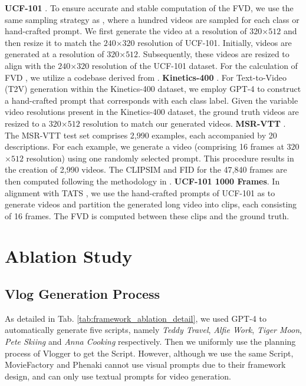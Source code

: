 \textbf{UCF-101} \cite{Soomro2012UCF101AD}.
To ensure accurate and stable computation of the FVD, we use the same sampling strategy as \cite{Wang2023LAVIEHV}, where a hundred videos are sampled for each class or hand-crafted prompt.
We first generate the video at a resolution of $320$$\times$$512$ and then resize it to match the $240$$\times$$320$ resolution of UCF-101.
Initially, videos are generated at a resolution of $320$$\times$$512$. 
Subsequently, these videos are resized to align with the $240$$\times$$320$ resolution of the UCF-101 dataset.
For the calculation of FVD \cite{unterthiner2019accurate}, we utilize a codebase derived from \cite{skorokhodov2022styleganv}.
\noindent\textbf{Kinetics-400} \cite{Kay2017TheKH}.
For Text-to-Video (T2V) generation within the Kinetics-400 dataset, we employ GPT-4 \cite{OpenAI2023GPT4TR} to construct a hand-crafted prompt that corresponds with each class label. 
Given the variable video resolutions present in the Kinetics-400 dataset, the ground truth videos are resized to a $320$$\times$$512$ resolution to match our generated videos.
\textbf{MSR-VTT} \cite{Chen2021TheMT}.
The MSR-VTT test set comprises 2,990 examples, each accompanied by 20 descriptions. 
For each example, we generate a video (comprising 16 frames at $320$$\times$$512$ resolution) using one randomly selected prompt. 
This procedure results in the creation of 2,990 videos.
The CLIPSIM \cite{Wu2021GODIVAGO} and FID \cite{parmar2022aliased} for the 47,840 frames are then computed following the methodology in \cite{singer2023makeavideo}.
\textbf{UCF-101 1000 Frames}.
In alignment with TATS \cite{Ge2022LongVG}, we use the hand-crafted prompts of UCF-101 as \cite{Ge2023PreserveYO} to generate videos and partition the generated long video into clips, each consisting of 16 frames. 
The FVD is computed between these clips and the ground truth.


\section{Ablation Study}
\label{sub:ablation}

\subsection{Vlog Generation Process}
As detailed in Tab. \ref{tab:framework_ablation_detail}, we used GPT-4 \cite{OpenAI2023GPT4TR} to automatically generate five scripts, namely \textit{Teddy Travel}, \textit{Alfie Work}, \textit{Tiger Moon}, \textit{Pete Skiing} and \textit{Anna Cooking} respectively.
Then we uniformly use the planning process of Vlogger to get the Script.
However, although we use the same Script, MovieFactory \cite{Zhu2023MovieFactoryAM} and Phenaki \cite{villegas2023phenaki} cannot use visual prompts due to their framework design, and can only use textual prompts for video generation.


